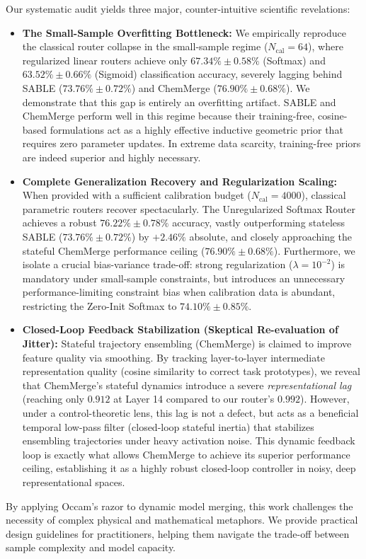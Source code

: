 Our systematic audit yields three major, counter-intuitive scientific revelations:
\begin{itemize}
    \item \textbf{The Small-Sample Overfitting Bottleneck:} We empirically reproduce the classical router collapse in the small-sample regime ($N_{\text{cal}} = 64$), where regularized linear routers achieve only $67.34\% \pm 0.58\%$ (Softmax) and $63.52\% \pm 0.66\%$ (Sigmoid) classification accuracy, severely lagging behind SABLE ($73.76\% \pm 0.72\%$) and ChemMerge ($76.90\% \pm 0.68\%$). We demonstrate that this gap is entirely an overfitting artifact. SABLE and ChemMerge perform well in this regime because their training-free, cosine-based formulations act as a highly effective inductive geometric prior that requires zero parameter updates. In extreme data scarcity, training-free priors are indeed superior and highly necessary.
    \item \textbf{Complete Generalization Recovery and Regularization Scaling:} When provided with a sufficient calibration budget ($N_{\text{cal}} = 4000$), classical parametric routers recover spectacularly. The Unregularized Softmax Router achieves a robust $76.22\% \pm 0.78\%$ accuracy, vastly outperforming stateless SABLE ($73.76\% \pm 0.72\%$) by $+2.46\%$ absolute, and closely approaching the stateful ChemMerge performance ceiling ($76.90\% \pm 0.68\%$). Furthermore, we isolate a crucial bias-variance trade-off: strong regularization ($\lambda=10^{-2}$) is mandatory under small-sample constraints, but introduces an unnecessary performance-limiting constraint bias when calibration data is abundant, restricting the Zero-Init Softmax to $74.10\% \pm 0.85\%$.
    \item \textbf{Closed-Loop Feedback Stabilization (Skeptical Re-evaluation of Jitter):} Stateful trajectory ensembling (ChemMerge) is claimed to improve feature quality via smoothing. By tracking layer-to-layer intermediate representation quality (cosine similarity to correct task prototypes), we reveal that ChemMerge's stateful dynamics introduce a severe \emph{representational lag} (reaching only $0.912$ at Layer 14 compared to our router's $0.992$). However, under a control-theoretic lens, this lag is not a defect, but acts as a beneficial temporal low-pass filter (closed-loop stateful inertia) that stabilizes ensembling trajectories under heavy activation noise. This dynamic feedback loop is exactly what allows ChemMerge to achieve its superior performance ceiling, establishing it as a highly robust closed-loop controller in noisy, deep representational spaces.
\end{itemize}

By applying Occam's razor to dynamic model merging, this work challenges the necessity of complex physical and mathematical metaphors. We provide practical design guidelines for practitioners, helping them navigate the trade-off between sample complexity and model capacity.

